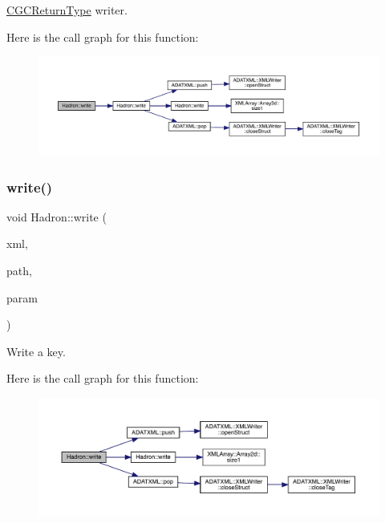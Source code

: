 \mbox{\hyperlink{structHadron_1_1CGCReturnType}{C\+G\+C\+Return\+Type}} writer. 

Here is the call graph for this function\+:
\nopagebreak
\begin{figure}[H]
\begin{center}
\leavevmode
\includegraphics[width=350pt]{d1/daf/namespaceHadron_a67e12d192d662851e588e9f3504ec45e_cgraph}
\end{center}
\end{figure}
\mbox{\label{namespaceHadron_ad432e121844a2fa83775051e43481116}} 
\subsubsection{\texorpdfstring{write()}{write()}\hspace{0.1cm}{\footnotesize\ttfamily [22/95]}}
{\footnotesize\ttfamily void Hadron\+::write (\begin{DoxyParamCaption}\item[{\mbox{\hyperlink{classADATXML_1_1XMLWriter}{X\+M\+L\+Writer}} \&}]{xml,  }\item[{const std\+::string \&}]{path,  }\item[{const \mbox{\hyperlink{structHadron_1_1KeyMesonElementalOperator__t}{Key\+Meson\+Elemental\+Operator\+\_\+t}} \&}]{param }\end{DoxyParamCaption})}



Write a key. 

Here is the call graph for this function\+:
\nopagebreak
\begin{figure}[H]
\begin{center}
\leavevmode
\includegraphics[width=350pt]{d1/daf/namespaceHadron_ad432e121844a2fa83775051e43481116_cgraph}
\end{center}
\end{figure}
\mbox{\label{namespaceHadron_a2d77dd144d88ef6a060cca397fb32373}} 
